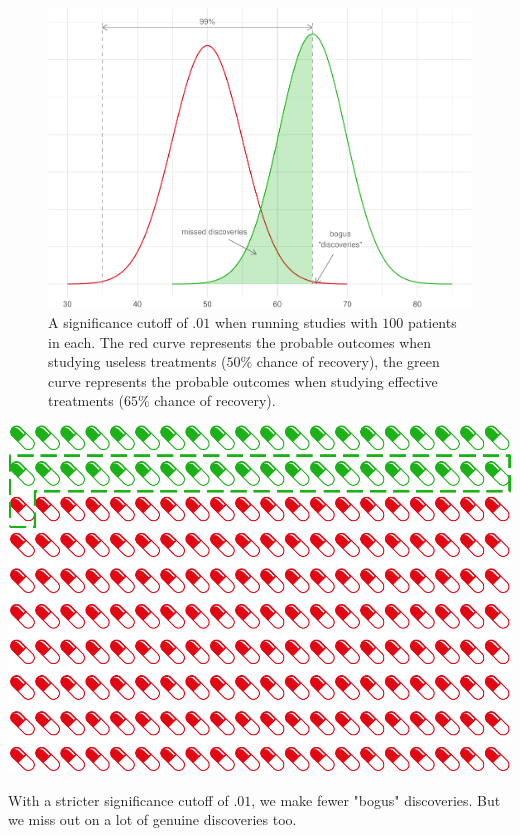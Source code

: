 \documentclass[justified]{tufte-book}
\theoremstyle{definition}
\theoremstyle{definition}
\theoremstyle{definition}
\theoremstyle{remark}
\begin{document}
\begin{figure}
\includegraphics{_main_files/figure-latex/hundredstudies2-1} \caption[A significance cutoff of $.01$ when running studies with $100$ patients in each]{A significance cutoff of $.01$ when running studies with $100$ patients in each. The red curve represents the probable outcomes when studying useless treatments ($50\%$ chance of recovery), the green curve represents the probable outcomes when studying effective treatments ($65\%$ chance of recovery).}\label{fig:hundredstudies2}
\end{figure}

\begin{marginfigure}
\includegraphics{_main_files/figure-latex/hundredstudiesgrid2-1} \caption[With a stricter significance cutoff of $.01$, we make fewer "bogus" discoveries]{With a stricter significance cutoff of $.01$, we make fewer "bogus" discoveries. But we miss out on a lot of genuine discoveries too.}\label{fig:hundredstudiesgrid2}
\end{marginfigure}
\end{document}
